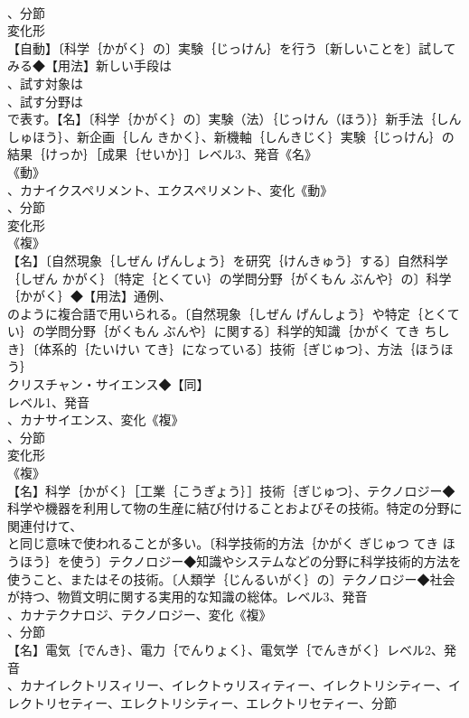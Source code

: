 \documentclass[8pt]{extreport}
\begin{document}
\begin{CJK}{UTF8}{min}
\\	、分節
\\	変化形 
\\	【自動】〔科学｛かがく｝の〕実験｛じっけん｝を行う〔新しいことを〕試してみる◆【用法】新しい手段は
\\	、試す対象は
\\	、試す分野は
\\	で表す。【名】〔科学｛かがく｝の〕実験（法）｛じっけん（ほう）｝新手法｛しんしゅほう｝、新企画｛しん きかく｝、新機軸｛しんきじく｝実験｛じっけん｝の結果｛けっか｝［成果｛せいか｝］レベル3、発音《名》
\\	《動》
\\	、カナイクスペリメント、エクスペリメント、変化《動》
\\	、分節
\\	変化形 
\\	《複》
\\	【名】〔自然現象｛しぜん げんしょう｝を研究｛けんきゅう｝する〕自然科学｛しぜん かがく｝〔特定｛とくてい｝の学問分野｛がくもん ぶんや｝の〕科学｛かがく｝◆【用法】通例、
\\	のように複合語で用いられる。〔自然現象｛しぜん げんしょう｝や特定｛とくてい｝の学問分野｛がくもん ぶんや｝に関する〕科学的知識｛かがく てき ちしき｝〔体系的｛たいけい てき｝になっている〕技術｛ぎじゅつ｝、方法｛ほうほう｝
\\	クリスチャン・サイエンス◆【同】
\\	レベル1、発音
\\	、カナサイエンス、変化《複》
\\	、分節
\\	変化形 
\\	《複》
\\	【名】科学｛かがく｝［工業｛こうぎょう｝］技術｛ぎじゅつ｝、テクノロジー◆科学や機器を利用して物の生産に結び付けることおよびその技術。特定の分野に関連付けて、
\\	と同じ意味で使われることが多い。〔科学技術的方法｛かがく ぎじゅつ てき ほうほう｝を使う〕テクノロジー◆知識やシステムなどの分野に科学技術的方法を使うこと、またはその技術。〔人類学｛じんるいがく｝の〕テクノロジー◆社会が持つ、物質文明に関する実用的な知識の総体。レベル3、発音
\\	、カナテクナロジ、テクノロジー、変化《複》
\\	、分節
\\	【名】電気｛でんき｝、電力｛でんりょく｝、電気学｛でんきがく｝レベル2、発音
\\	、カナイレクトリスィリー、イレクトゥリスィティー、イレクトリシティー、イレクトリセティー、エレクトリシティー、エレクトリセティー、分節

\end{CJK}
\end{document}
